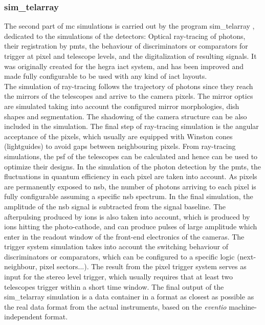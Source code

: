 \documentclass[main.tex]{subfiles}
\begin{document}
\subsubsection{sim\_telarray}

The second part of \gls{mc} simulations is carried out by the program sim\_telarray \cite{2008corsikanadsimtelarray}, dedicated to the simulations of the detectors: Optical ray-tracing of photons, their registration by \glspl{pmt}, the behaviour of discriminators or comparators for trigger at pixel and telescope levels, and the digitalization of resulting signals. It was originally created for the \gls{hegra} \gls{iact} system, and has been improved and made fully configurable to be used with any kind of \gls{iact} layouts.\\
The simulation of ray-tracing follows the trajectory of photons since they reach the mirrors of the telescopes and arrive to the camera pixels. The mirror optics are simulated taking into account the configured mirror morphologies, dish shapes and segmentation. The shadowing of the camera structure can be also included in the simulation. The final step of ray-tracing simulation is the angular acceptance of the pixels, which usually are equipped with Winston cones (lightguides) to avoid gaps between neighbouring pixels. From ray-tracing simulations, the \gls{psf} of the telescopes can be calculated and hence can be used to optimize their designs. In the simulation of the photon detection by the \glspl{pmt}, the fluctuations in quantum efficiency in each pixel are taken into account.  As pixels are permanently exposed to \gls{nsb}, the number of photons arriving to each pixel is fully configurable assuming a specific \gls{nsb} spectrum. In the final simulation, the amplitude of the \gls{nsb} signal is subtracted from the signal baseline. The afterpulsing produced by ions is also taken into account, which is produced by ions hitting the photo-cathode, and can produce pulses of large amplitude which enter in the readout window of the front-end electronics of the cameras. The trigger system simulation takes into account the switching behaviour of discriminators or comparators, which can be configured to a specific logic (next-neighbour, pixel sectors...). The result from the pixel trigger system serves as input for the stereo level trigger, which usually requires that at least two telescopes trigger within a short time window. The final output of the sim\_telarray simulation is a data container in a format as closest as possible as the real data format from the actual instruments, based on the \textit{eventio} machine-independent format.
\end{document}
